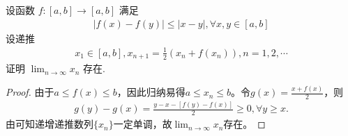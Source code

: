 \documentclass[../../main.tex]{subfiles}%
\begin{document}
\begin{example}
设函数 $f:[a,b] \to [a,b]$ 满足
\begin{align*}
|f(x) - f(y)| \leqslant |x - y|, \forall x,y \in [a,b]
\end{align*}
设递推
\begin{align*}
x_1 \in [a,b], x_{n+1} = \frac{1}{2}(x_n + f(x_n)), n = 1,2,\cdots
\end{align*}
证明 $\lim_{n \to \infty} x_n$ 存在.
\end{example}
\begin{proof}
由于$a \leqslant f(x) \leqslant b$，因此归纳易得$a \leqslant x_n \leqslant b$。令$g(x) = \frac{x + f(x)}{2}$，则
\begin{align*}
g(y) - g(x) = \frac{y - x - [f(y) - f(x)]}{2} \geqslant 0, \forall y \geqslant x.
\end{align*}
由可知递增递推数列$\{ x_n \}$一定单调，故$\lim_{n \to \infty} x_n$存在。
\end{proof}
\end{document}
